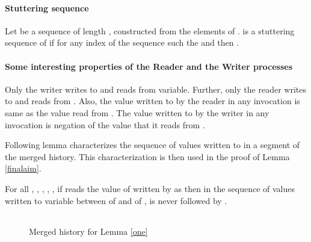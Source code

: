 \begin{description}
\paragraph{\textbf{Stuttering sequence}}
 Let  be a sequence of length , constructed from the elements of .  is a stuttering sequence of  if for any index  of the sequence  such the  and  then . 
 



\paragraph{\textbf{Some interesting properties of the Reader and the Writer processes}}
Only the writer writes to  and reads from  variable. Further, only the reader writes to  and reads from . Also, the value written to  by the reader in any invocation is same as the value read from . The value written to  by the writer in any invocation is negation of the value that it reads from . 


Following lemma characterizes the sequence of values written to  in a segment of the merged history. This characterization is then used in the proof of Lemma \ref{finalaim}. 
\begin{lemma}\label{one}
For all , , , , , if  reads the value of  written by  as  then in the sequence of values written to variable  between  of  and  of ,  is never followed by .
\end{lemma}
 \begin{figure}[h]
\begin{tabular}{@{}c@{~}}

\end{tabular}
\caption{Merged history for Lemma \ref{one} }
\label{lem:fig1}
\end{figure}


\end{description}
